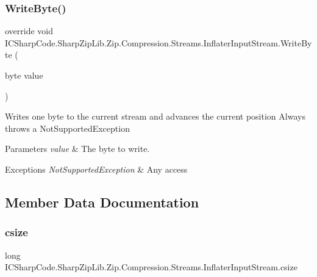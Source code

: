 \subsubsection{\texorpdfstring{Write\+Byte()}{WriteByte()}\hspace{0.1cm}{\footnotesize\ttfamily [2/2]}}
{\footnotesize\ttfamily override void I\+C\+Sharp\+Code.\+Sharp\+Zip\+Lib.\+Zip.\+Compression.\+Streams.\+Inflater\+Input\+Stream.\+Write\+Byte (\begin{DoxyParamCaption}\item[{byte}]{value }\end{DoxyParamCaption})\hspace{0.3cm}{\ttfamily [inline]}}



Writes one byte to the current stream and advances the current position Always throws a Not\+Supported\+Exception 


\begin{DoxyParams}{Parameters}
{\em value} & The byte to write.\\
\hline
\end{DoxyParams}

\begin{DoxyExceptions}{Exceptions}
{\em Not\+Supported\+Exception} & Any access\\
\hline
\end{DoxyExceptions}


\subsection{Member Data Documentation}
\mbox{\label{class_i_c_sharp_code_1_1_sharp_zip_lib_1_1_zip_1_1_compression_1_1_streams_1_1_inflater_input_stream_ae02aed532a9d3ab472125bab5959271f}} 
\subsubsection{\texorpdfstring{csize}{csize}}
{\footnotesize\ttfamily long I\+C\+Sharp\+Code.\+Sharp\+Zip\+Lib.\+Zip.\+Compression.\+Streams.\+Inflater\+Input\+Stream.\+csize\hspace{0.3cm}{\ttfamily [protected]}}




